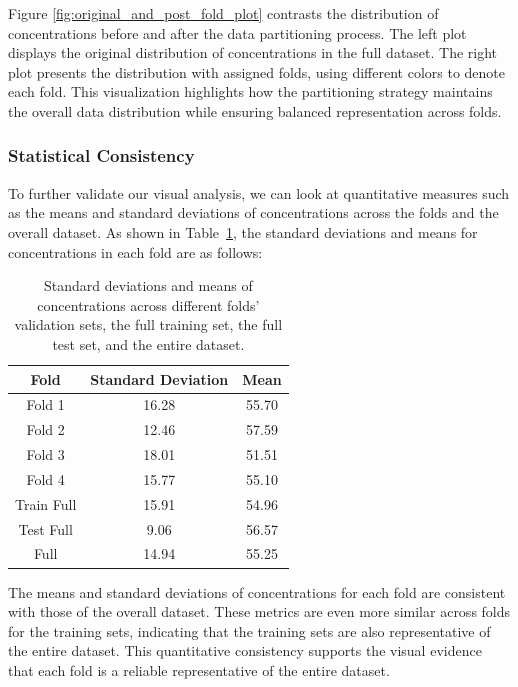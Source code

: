 Figure \ref{fig:original_and_post_fold_plot} contrasts the distribution of  concentrations before and after the data partitioning process.
The left plot displays the original distribution of  concentrations in the full dataset.
The right plot presents the distribution with assigned folds, using different colors to denote each fold.
This visualization highlights how the partitioning strategy maintains the overall data distribution while ensuring balanced representation across folds.

\subsubsection{Statistical Consistency}
To further validate our visual analysis, we can look at quantitative measures such as the means and standard deviations of  concentrations across the folds and the overall dataset.
As shown in Table~\ref{tab:siO2_std_means}, the standard deviations and means for  concentrations in each fold are as follows:

\begin{table}[h!]
    \centering
    \begin{tabular}{|c|c|c|}
        \hline
        \textbf{Fold} & \textbf{Standard Deviation} & \textbf{Mean} \\
        \hline
        Fold 1 & 16.28 & 55.70 \\
        \hline
        Fold 2 & 12.46 & 57.59 \\
        \hline
        Fold 3 & 18.01 & 51.51 \\
        \hline
        Fold 4 & 15.77 & 55.10 \\
        \hline
        Train Full & 15.91 & 54.96 \\
        \hline
        Test Full & 9.06 & 56.57 \\
        \hline
        Full & 14.94 & 55.25 \\
        \hline
    \end{tabular}
    \caption{Standard deviations and means of  concentrations across different folds' validation sets, the full training set, the full test set, and the entire dataset.}
    \label{tab:siO2_std_means}
\end{table}

The means and standard deviations of  concentrations for each fold are consistent with those of the overall dataset.
These metrics are even more similar across folds for the training sets, indicating that the training sets are also representative of the entire dataset.
This quantitative consistency supports the visual evidence that each fold is a reliable representative of the entire dataset.

